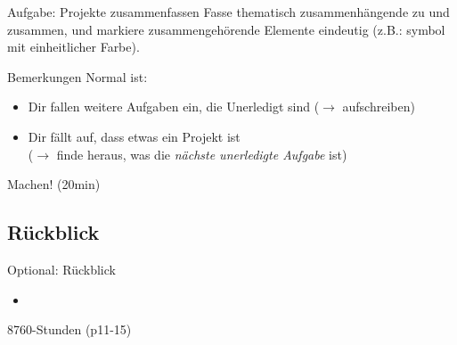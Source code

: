 \begin{frame}[c]{Aufgabe: Projekte zusammenfassen}
    Fasse thematisch zusammenhängende  zu  und
     zusammen, und markiere zusammengehörende Elemente
    eindeutig (z.B.: symbol mit einheitlicher Farbe).
    
\end{frame}


\begin{frame}[c]{Bemerkungen}
    Normal ist:
    \begin{itemize}[<+(1)->]
        \item Dir fallen weitere Aufgaben ein, die Unerledigt sind ($\rightarrow$ aufschreiben)
        \item Dir fällt auf, dass etwas ein Projekt ist \\ ($\rightarrow$ finde heraus, was die {\em nächste unerledigte Aufgabe} ist)
    \end{itemize}
\end{frame}


\begin{frame}[standout]
    Machen! (20min)
\end{frame}


\subsection{Rückblick}

\begin{frame}[c]{Optional: Rückblick}
    \Large
    \begin{itemize}[<+(1)->]
        \item 
    \end{itemize}
\end{frame}

\begin{frame}[c]{8760-Stunden} 
    \cite{8760-hours} (p11-15)
    \cite{better-goals-2}
\end{frame}
    
